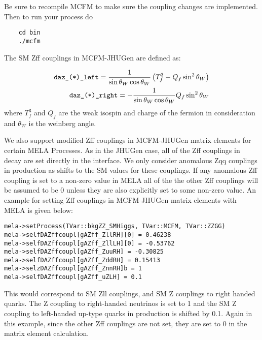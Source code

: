 \documentclass[aps,superscriptaddress,nofootinbib]{revtex4}
\begin{document}
Be sure to recompile MCFM to make sure the coupling changes are implemented. Then to run your process do 
\begin{verbatim}
    cd bin 
    ./mcfm
\end{verbatim}
The SM Zff couplings in MCFM-JHUGen are defined as:

\begin{eqnarray*}
  \verb|daz_(*)_left| = \frac{1}{\sin\theta_{W}\cos\theta_{W}} \left(T^{3}_{f}-Q_{f} \sin^2 \theta_{W}\right) \\
  \verb|daz_(*)_right| = -\frac{1}{\sin\theta_{W}\cos\theta_{W}} Q_{f} \sin^2 \theta_{W}
\end{eqnarray*}
where $T^{3}_{f}$ and $Q_{f}$ are the weak isospin and charge of the fermion in consideration and $\theta_{W}$ is the weinberg angle.

We also support modified Zff couplings in MCFM-JHUGen matrix elements for certain MELA Processes. As in the JHUGen case, all of the Zff couplings in decay 
are set directly in the interface. We only consider anomalous Zqq couplings in production as shifts to the SM values for these couplings. If any anomalous Zff coupling is set to a non-zero value in MELA all of the the other Zff couplings will be assumed to be 0
unless they are also explicitly set to some non-zero value. An example for setting Zff couplings in MCFM-JHUGen matrix elements with MELA is given below:

\begin{verbatim}
mela->setProcess(TVar::bkgZZ_SMHiggs, TVar::MCFM, TVar::ZZGG)
mela->selfDAZffcoupl[gAZff_ZllRH][0] = 0.46238
mela->selfDAZffcoupl[gAZff_ZllLH][0] = -0.53762
mela->selfDAZffcoupl[gAZff_ZuuRH] = -0.30825
mela->selfDAZffcoupl[gAZff_ZddRH] = 0.15413
mela->selzDAZffcoupl[gAZff_ZnnRH]b = 1
mela->selfDAZffcoupl[gAZff_uZLH] = 0.1 
\end{verbatim}

This would correspond to SM Zll couplings, and SM Z couplings to right handed quarks. The Z coupling to right-handed neutrinos is set to 1 and the SM Z coupling to left-handed
up-type quarks in production is shifted by 0.1. Again in this example, since the other Zff couplings are not set, they are set to 0 in the matrix element calculation.
\end{document}
